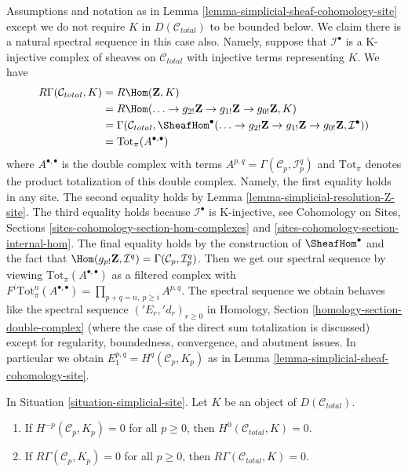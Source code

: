 \begin{remark}
\label{remark-simplicial-cohomology-site}
Assumptions and notation as in
Lemma \ref{lemma-simplicial-sheaf-cohomology-site}
except we do not require $K$ in $D(\mathcal{C}_{total})$
to be bounded below. We claim there is a natural
spectral sequence in this case also. Namely, suppose
that $\mathcal{I}^\bullet$ is a K-injective complex of sheaves on
$\mathcal{C}_{total}$ with injective terms representing $K$.
We have
\begin{align*}
R\Gamma(\mathcal{C}_{total}, K)
& =
R\Hom(\mathbf{Z}, K) \\
& =
R\Hom(
\ldots \to g_{2!}\mathbf{Z} \to g_{1!}\mathbf{Z} \to g_{0!}\mathbf{Z}, K) \\
& =
\Gamma(\mathcal{C}_{total},
\SheafHom^\bullet(
\ldots \to g_{2!}\mathbf{Z} \to g_{1!}\mathbf{Z} \to g_{0!}\mathbf{Z},
\mathcal{I}^\bullet)) \\
& =
\text{Tot}_\pi(A^{\bullet, \bullet})
\end{align*}
where $A^{\bullet, \bullet}$ is the double complex with terms
$A^{p, q} = \Gamma(\mathcal{C}_p, \mathcal{I}^q_p)$ and $\text{Tot}_\pi$
denotes the product totalization of this double complex.
Namely, the first equality holds in any site. The second equality
holds by Lemma \ref{lemma-simplicial-resolution-Z-site}.
The third equality holds because $\mathcal{I}^\bullet$ is K-injective, see
Cohomology on Sites, Sections \ref{sites-cohomology-section-hom-complexes}
and \ref{sites-cohomology-section-internal-hom}.
The final equality holds by the construction of $\SheafHom^\bullet$
and the fact that $\Hom(g_{p!}\mathbf{Z}, \mathcal{I}^q) =
\Gamma(\mathcal{C}_p, \mathcal{I}^q_p)$.
Then we get our spectral sequence by viewing
$\text{Tot}_\pi(A^{\bullet, \bullet})$ as a filtered
complex with $F^i\text{Tot}^n_\pi(A^{\bullet, \bullet}) =
\prod_{p + q = n,\ p \geq i} A^{p, q}$. The spectral sequence
we obtain behaves like the spectral sequence $({}'E_r, {}'d_r)_{r \geq 0}$ in
Homology, Section \ref{homology-section-double-complex}
(where the case of the direct sum totalization
is discussed) except for regularity, boundedness, convergence, and
abutment issues. In particular we obtain $E_1^{p, q} = H^q(\mathcal{C}_p, K_p)$
as in Lemma \ref{lemma-simplicial-sheaf-cohomology-site}.
\end{remark}

\begin{lemma}
\label{lemma-simplicial-sheaf-cohomology-site-zero}
In Situation \ref{situation-simplicial-site}. Let $K$ be an object of
$D(\mathcal{C}_{total})$.
\begin{enumerate}
\item If $H^{-p}(\mathcal{C}_p, K_p) = 0$ for all $p \geq 0$, then
$H^0(\mathcal{C}_{total}, K) = 0$.
\item If $R\Gamma(\mathcal{C}_p, K_p) = 0$
for all $p \geq 0$, then $R\Gamma(\mathcal{C}_{total}, K) = 0$.
\end{enumerate}
\end{lemma}

